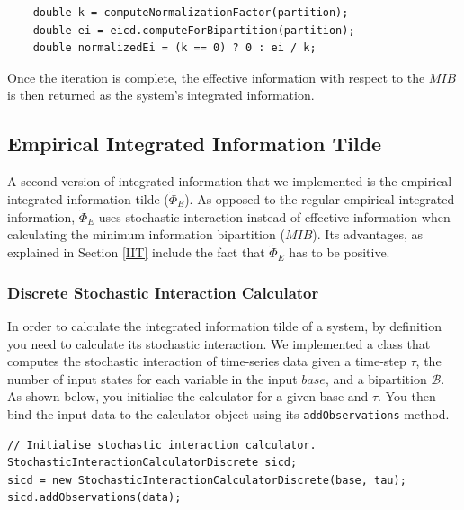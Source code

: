 \documentclass[a4paper,11pt]{article}
\begin{document}
\begin{verbatim}
	double k = computeNormalizationFactor(partition);
	double ei = eicd.computeForBipartition(partition);
	double normalizedEi = (k == 0) ? 0 : ei / k;
\end{verbatim}

Once the iteration is complete, the effective information with respect to the $MIB$ is then returned as the system's integrated information. 

\subsection{Empirical Integrated Information Tilde}
\label{sec:impl:phi-e-tilde}

A second version of integrated information that we implemented is the empirical integrated information tilde ($\widetilde{\Phi}_{E}$). As opposed to the regular empirical integrated information, $\widetilde{\Phi}_{E}$ uses stochastic interaction instead of effective information when calculating the minimum information bipartition ($MIB$). Its advantages, as explained in Section \ref{IIT} include the fact that $\widetilde{\Phi}_{E}$ has to be positive.

\subsubsection{Discrete Stochastic Interaction Calculator}
\label{sec:impl:stochastic}

In order to calculate the integrated information tilde of a system, by definition you need to calculate its stochastic interaction. We implemented a class that computes the stochastic interaction of time-series data given a time-step $\tau$, the number of input states for each variable in the input $base$, and a bipartition $\mathcal{B}$. As shown below, you initialise the calculator for a given base and $\tau$. You then bind the input data to the calculator object using its \texttt{addObservations} method.

\begin{verbatim}
// Initialise stochastic interaction calculator.
StochasticInteractionCalculatorDiscrete sicd;
sicd = new StochasticInteractionCalculatorDiscrete(base, tau);
sicd.addObservations(data);
\end{verbatim}
\end{document}
